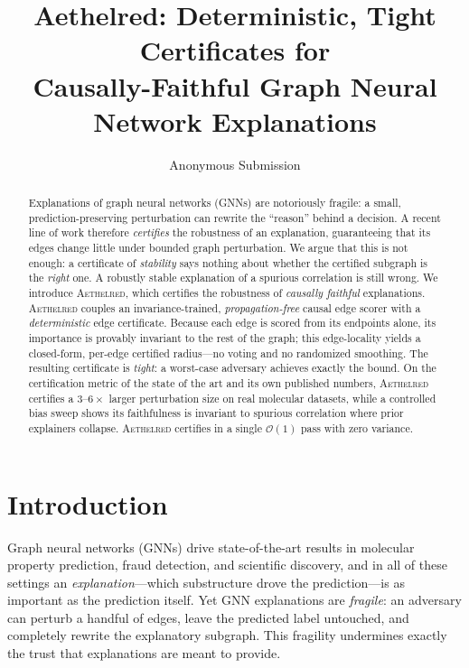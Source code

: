 \documentclass[letterpaper]{article}
\title{Aethelred: Deterministic, Tight Certificates for\\
       Causally-Faithful Graph Neural Network Explanations}
\author{Anonymous Submission}
\newcommand{\aeth}{\textsc{Aethelred}}
\newcommand{\bigO}{\mathcal{O}}
\begin{document}
\maketitle

\begin{abstract}
Explanations of graph neural networks (GNNs) are notoriously fragile: a small,
prediction-preserving perturbation can rewrite the ``reason'' behind a decision.
A recent line of work therefore \emph{certifies} the robustness of an
explanation, guaranteeing that its edges change little under bounded graph
perturbation. We argue that this is not enough: a certificate of
\emph{stability} says nothing about whether the certified subgraph is the
\emph{right} one. A robustly stable explanation of a spurious correlation is
still wrong. We introduce \aeth{}, which certifies the robustness of
\emph{causally faithful} explanations. \aeth{} couples an invariance-trained,
\emph{propagation-free} causal edge scorer with a \emph{deterministic} edge
certificate. Because each edge is scored from its endpoints alone, its
importance is provably invariant to the rest of the graph; this edge-locality
yields a closed-form, per-edge certified radius---no voting and no randomized
smoothing. The resulting certificate is \emph{tight}: a worst-case adversary
achieves exactly the bound. On the certification metric of the state of the art
and its own published numbers, \aeth{} certifies a $3$--$6\times$ larger
perturbation size on real molecular datasets, while a controlled bias sweep
shows its faithfulness is invariant to spurious correlation where prior
explainers collapse. \aeth{} certifies in a single $\bigO(1)$ pass with zero
variance.
\end{abstract}

\section{Introduction}
\label{sec:intro}

Graph neural networks (GNNs) drive state-of-the-art results in molecular
property prediction, fraud detection, and scientific discovery, and in all of
these settings an \emph{explanation}---which substructure drove the
prediction---is as important as the prediction itself. Yet GNN explanations are
\emph{fragile}: an adversary can perturb a handful of edges, leave the predicted
label untouched, and completely rewrite the explanatory subgraph. This fragility
undermines exactly the trust that explanations are meant to provide.
\end{document}
